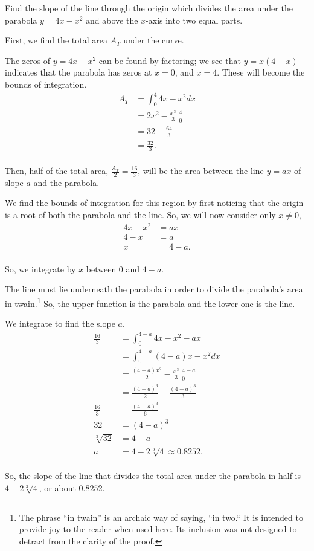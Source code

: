 \documentclass[../hw6.tex]{subfiles}
\begin{document}
Find the slope of the line through the origin which divides the area under the parabola $y=4x-x^2$ and above the $x$-axis into two equal parts.

First, we find the total area $A_T$ under the curve.

The zeros of $y=4x-x^2$ can be found by factoring; we see that $y=x(4-x)$ indicates that the parabola has zeros at $x=0$, and $x=4$. These will become the bounds of integration.
\begin{align*}
    A_T &= \int_{0}^{4} 4x-x^2 dx \\
    &= 2x^2-\frac{x^3}{3}\Bigg\vert_{0}^{4} \\
    &= 32 - \frac{64}{3} \\
    &= \frac{32}{3}. \\
\end{align*}

Then, half of the total area, $\frac{A_T}{2}=\frac{16}{3}$, will be the area between the line $y=ax$ of slope $a$ and the parabola.

We find the bounds of integration for this region by first noticing that the origin is a root of both the parabola and the line. So, we will now consider only $x\neq0$,
\begin{align*}
    4x-x^2 &= ax \\
    4-x &= a \\
    x &= 4-a. \\
\end{align*}

So, we integrate by $x$ between 0 and $4-a$.

The line must lie underneath the parabola in order to divide the parabola's area in twain.\footnote{The phrase ``in twain'' is an archaic way of saying, ``in two.`` It is intended to provide joy to the reader when used here. Its inclusion was not designed to detract from the clarity of the proof.} So, the upper function is the parabola and the lower one is the line.

We integrate to find the slope $a$.
\begin{align*}
    \frac{16}{3} &= \int_{0}^{4-a}4x-x^2-ax \\
    &= \int_{0}^{4-a} (4-a)x-x^2 dx \\
    &= \frac{(4-a)x^2}{2}-\frac{x^3}{3} \Bigg\vert_{0}^{4-a} \\
    &= \frac{{(4-a)}^3}{2}-\frac{{(4-a)}^3}{3} \\
    \frac{16}{3} &= \frac{{(4-a)}^3}{6} \\
    32 &= {(4-a)}^3 \\
    \sqrt[3]{32} &= 4-a \\
    a &= 4-2\sqrt[3]{4} \approx 0.8252. \\
\end{align*}

So, the slope of the line that divides the total area under the parabola in half is $4-2\sqrt[3]{4}$, or about $0.8252$.
\end{document}
